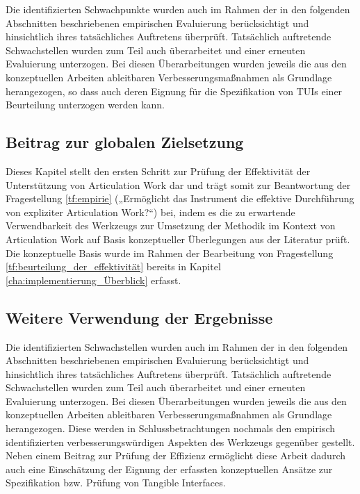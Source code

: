 Die identifizierten Schwachpunkte wurden auch im Rahmen der in den folgenden Abschnitten beschriebenen empirischen Evaluierung berücksichtigt und hinsichtlich ihres tatsächliches Auftretens überprüft. Tatsächlich auftretende Schwachstellen wurden zum Teil auch überarbeitet und einer erneuten Evaluierung unterzogen. Bei diesen Überarbeitungen wurden jeweils die aus den konzeptuellen Arbeiten ableitbaren Verbesserungsmaßnahmen als Grundlage herangezogen, so dass auch deren Eignung für die Spezifikation von \glspl{TUI} einer Beurteilung unterzogen werden kann.


\subsection{Beitrag zur globalen Zielsetzung}

Dieses Kapitel stellt den ersten Schritt zur Prüfung der Effektivität der Unterstützung von Articulation Work dar und trägt somit zur Beantwortung der Fragestellung \ref{tf:empirie} („Ermöglicht das Instrument die effektive Durchführung von expliziter Articulation Work?“) bei, indem es die zu erwartende Verwendbarkeit des Werkzeugs zur Umsetzung der Methodik im Kontext von Articulation Work auf Basis konzeptueller Überlegungen aus der Literatur prüft. Die konzeptuelle Basis wurde im Rahmen der Bearbeitung von Fragestellung \ref{tf:beurteilung_der_effektivität} bereits in Kapitel \ref{cha:implementierung_Überblick} erfasst.

\subsection{Weitere Verwendung der Ergebnisse}

Die identifizierten Schwachstellen wurden auch im Rahmen der in den folgenden Abschnitten beschriebenen empirischen Evaluierung berücksichtigt und hinsichtlich ihres tatsächliches Auftretens überprüft. Tatsächlich auftretende Schwachstellen wurden zum Teil auch überarbeitet und einer erneuten Evaluierung unterzogen. Bei diesen Überarbeitungen wurden jeweils die aus den konzeptuellen Arbeiten ableitbaren Verbesserungsmaßnahmen als Grundlage herangezogen. Diese werden in Schlussbetrachtungen nochmals den empirisch identifizierten verbesserungswürdigen Aspekten des Werkzeugs gegenüber gestellt. Neben einem Beitrag zur Prüfung der Effizienz ermöglicht diese Arbeit dadurch auch eine Einschätzung der Eignung der erfassten konzeptuellen Ansätze zur Spezifikation bzw. Prüfung von Tangible Interfaces.


